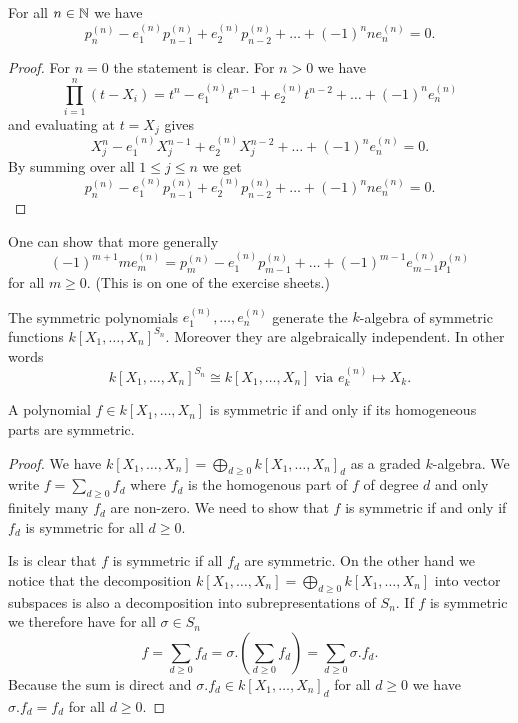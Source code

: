 \begin{cor}
 For all $n \in \mathbb{N}$ we have
 \[
  p^{(n)}_n - e^{(n)}_1 p^{(n)}_{n-1} + e^{(n)}_2 p^{(n)}_{n-2} + \ldots + (-1)^n n e^{(n)}_n = 0.
 \]
\end{cor}
\begin{proof}
 For $n = 0$ the statement is clear. For $n > 0$ we have
 \[
  \prod_{i=1}^n (t-X_i) = t^n - e^{(n)}_1 t^{n-1} + e^{(n)}_2 t^{n-2} + \ldots + (-1)^n e^{(n)}_n
 \]
 and evaluating at $t = X_j$ gives
 \[
  X_j^n - e^{(n)}_1 X_j^{n-1} + e^{(n)}_2 X_j^{n-2} + \ldots + (-1)^n e^{(n)}_n = 0.
 \]
 By summing over all $1 \leq j \leq n$ we get
 \[
  p^{(n)}_n - e^{(n)}_1 p^{(n)}_{n-1} + e^{(n)}_2 p^{(n)}_{n-2} + \ldots + (-1)^n n e^{(n)}_n = 0.
 \]
\end{proof}


\begin{rem}
 One can show that more generally
 \[
  (-1)^{m+1} m e^{(n)}_m = p^{(n)}_m - e^{(n)}_1 p^{(n)}_{m-1} + \ldots + (-1)^{m-1} e^{(n)}_{m-1} p^{(n)}_1
 \]
 for all $m \geq 0$. (This is on one of the exercise sheets.)
\end{rem}


\begin{thrm}
 The symmetric polynomials $e^{(n)}_1, \ldots, e^{(n)}_n$ generate the $k$-algebra of symmetric functions $k[X_1, \ldots, X_n]^{S_n}$. Moreover they are algebraically independent. In other words
 \[
  k[X_1, \ldots, X_n]^{S_n} \cong k[X_1, \ldots, X_n] \text{ via } e^{(n)}_k \mapsto X_k.
 \]
\end{thrm}


\begin{lem}
 A polynomial $f \in k[X_1, \ldots, X_n]$ is symmetric if and only if its homogeneous parts are symmetric.
\end{lem}
\begin{proof}
 We have $k[X_1, \ldots, X_n] = \bigoplus_{d \geq 0} k[X_1, \ldots, X_n]_d$ as a graded $k$-algebra. We write $f = \sum_{d \geq 0} f_d$ where $f_d$ is the homogenous part of $f$ of degree $d$ and only finitely many $f_d$ are non-zero. We need to show that $f$ is symmetric if and only if $f_d$ is symmetric for all $d \geq 0$.
 
 Is is clear that $f$ is symmetric if all $f_d$ are symmetric. On the other hand we notice that the decomposition $k[X_1, \ldots, X_n] = \bigoplus_{d \geq 0} k[X_1, \ldots, X_n]$ into vector subspaces is also a decomposition into subrepresentations of $S_n$. If $f$ is symmetric we therefore have for all $\sigma \in S_n$
 \[
  f = \sum_{d \geq 0} f_d = \sigma.\left( \sum_{d \geq 0} f_d \right) = \sum_{d \geq 0} \sigma.f_d.
 \]
 Because the sum is direct and $\sigma.f_d \in k[X_1, \ldots, X_n]_d$ for all $d \geq 0$ we have $\sigma.f_d = f_d$ for all $d \geq 0$.
\end{proof}


